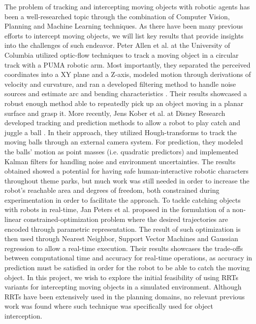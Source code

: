 \documentclass[letterpaper, 10 pt, conference]{ieeeconf}  %
\begin{document}
The problem of tracking and intercepting moving objects with robotic agents has
been a well-researched topic through the combination of Computer Vision,
Planning and Machine Learning techniques. As there have been many previous efforts to intercept moving objects,
we will list key results that provide insights into the challenges of such
endeavor. Peter Allen et al. at the University of Columbia utilized optic-flow
techniques to track a moving object in a circular track with a PUMA robotic
arm. Most importantly, they separated the perceived coordinates into a XY plane
and a Z-axis, modeled motion through derivations of velocity and curvature, and
ran a developed filtering method to handle noise sources and estimate arc and
bending characteristics \cite{Allen91automatedtracking}. Their results
showcased a robust enough method able to repeatedly pick up an object moving in
a planar surface and grasp it.  More recently, Jens Kober et al. at Disney
Research developed tracking and prediction methods to allow a robot to play
catch and juggle a ball \cite{koberplaying}. In their approach, they utilized
Hough-transforms to track the moving balls through an external camera system.
For prediction, they modeled the balls’ motion as point masses (i.e. quadratic
predictors) and implemented Kalman filters for handling noise and environment
uncertainties. The results obtained showed a potential for having safe
human-interactive robotic characters throughout theme parks, but much work was
still needed in order to increase the robot’s reachable area and degrees of
freedom, both constrained during experimentation in order to facilitate the
approach. To tackle catching objects with robots in real-time, Jan Peters et
al. proposed in \cite{lampariello2011trajectory} the formulation of a
non-linear constrained-optimization problem where the desired trajectories are
encoded through parametric representation. The result of such optimization is
then used through Nearest Neighbor, Support Vector Machines and Gaussian
regression to allow a real-time execution. Their results showcases the
trade-offs between computational time and accuracy for real-time operations, as
accuracy in prediction must be satisfied in order for the robot to be able to
catch the moving object. In this project, we wish to explore the initial
feasibility of using RRTs variants for intercepting moving objects in a
simulated environment. Although RRTs have been extensively used in the planning
domains, no relevant previous work was found where such technique was
specifically used for object interception.
\end{document}
